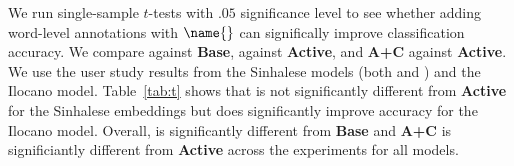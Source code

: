 We run single-sample $t$-tests with $.05$ significance level to see whether
adding word-level annotations with $\name{}$ can significally improve
classification accuracy.
We compare \name{} against \textbf{Base}, \name{} against \textbf{Active}, and
\textbf{A+C} against \textbf{Active}.  We use the user study results from the
Sinhalese models (both  and ) and the Ilocano model.
Table~\ref{tab:t} shows that
\name{} is not
significantly different from \textbf{Active} for the Sinhalese 
embeddings but does significantly improve accuracy for the Ilocano model.
Overall, \name{} is significantly
different from \textbf{Base} and \textbf{A+C} is significiantly different from
\textbf{Active} across the experiments for all models.

